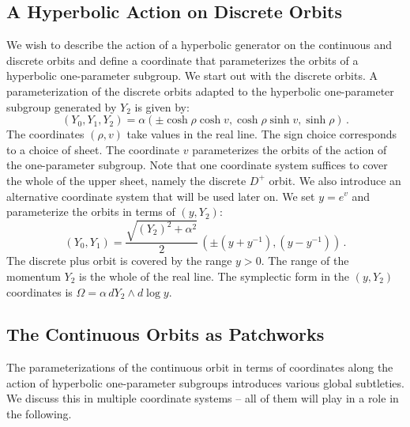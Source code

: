 \documentclass[12pt]{article}
\numberwithin{equation}{section}
\numberwithin{equation}{section}
\numberwithin{table}{section}\setlength{\multlinegap}{25pt}
\begin{document}
\subsection{A Hyperbolic Action on Discrete Orbits}
\label{hypactionondiscrete}

 We wish to describe the action of a hyperbolic generator on the continuous and discrete orbits and define a coordinate that parameterizes the orbits of a hyperbolic one-parameter subgroup. 
 We start out with the discrete orbits.
A  parameterization of the discrete orbits adapted to the hyperbolic one-parameter subgroup generated by $Y_2$ is given by:
\begin{equation}
(Y_0,Y_1,Y_2) = \alpha (\pm \cosh \rho \cosh v,  \cosh \rho \sinh v, \sinh \rho) \, .
\label{DiscreteOrbitRhoAndV}
\end{equation}
The coordinates $(\rho,v)$ take values in the real line. 
The  sign choice corresponds to a choice of  sheet. The coordinate $v$ parameterizes the orbits of the action of the one-parameter subgroup. 
Note that one coordinate system suffices to cover the whole of the upper sheet, namely the discrete $D^+$ orbit.
We also introduce an alternative coordinate system that will be used later on. We  set $y=e^v$ and  parameterize the orbits in terms of $(y,Y_2)$:
\begin{equation}
(Y_0,Y_1) = \frac{\sqrt{(Y_2)^2+\alpha^2}}{2} \,\left(\pm (y+y^{-1}), (y-y^{-1}) \right) \, .
\end{equation}
The discrete plus orbit is covered by the range $y>0$. The range of the momentum $Y_2$ is the whole of the real line. The symplectic form in the $(y, Y_2)$ coordinates is $\Omega = \alpha\, dY_2\wedge d\log y$.  


\subsection{The Continuous Orbits as Patchworks}
The parameterizations of the continuous orbit in terms of coordinates along the action of hyperbolic one-parameter subgroups  introduces various global subtleties. We discuss this in multiple coordinate systems -- all of them will play in a role in the following.
\end{document}
